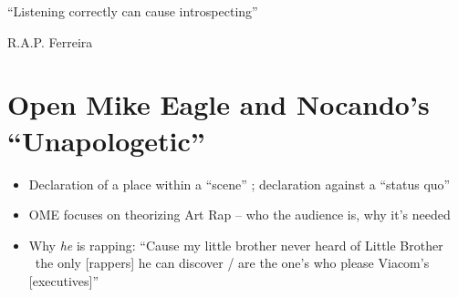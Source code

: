 \onehalfspacing

\epigraph{{``Listening correctly can cause introspecting''}}{R.A.P. Ferreira}

\section{Open Mike Eagle and Nocando's ``Unapologetic''}

\begin{itemize}
    \item Declaration of a place within a ``scene'' ; declaration against a ``status quo''
    \item OME focuses on theorizing Art Rap -- who the audience is, why it's needed
    \item Why \emph{he} is rapping: ``Cause my little brother never heard of Little Brother 
    \textellipsis~the only [rappers] he can discover / are the one's who please Viacom's [executives]''
\end{itemize}

